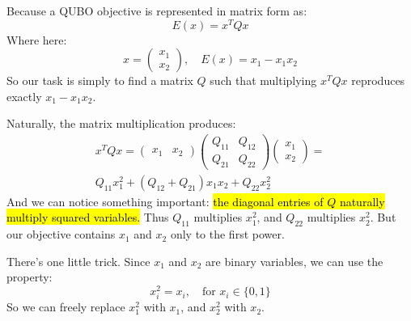 \begin{deepeningbox}
    Because a QUBO objective is represented in matrix form as:
    \begin{equation*}
        E(x) = x^T Q x
    \end{equation*}
    Where here:
    \begin{equation*}
        x =
        \begin{pmatrix}
            x_1 \\
            x_2
        \end{pmatrix},
        \quad
        E(x) = x_1 - x_1 x_2
    \end{equation*}
    So our task is simply to find a matrix $Q$ such that multiplying $x^T Q x$ reproduces exactly $x_1 - x_1 x_2$.

    \highspace
    Naturally, the matrix multiplication produces:
    \begin{gather*}
        x^T Q x =
        \begin{pmatrix}
            x_1 & x_2
        \end{pmatrix}
        \begin{pmatrix}
            Q_{11} & Q_{12} \\
            Q_{21} & Q_{22}
        \end{pmatrix}
        \begin{pmatrix}
            x_1 \\
            x_2
        \end{pmatrix}
        = \\
        Q_{11}x_1^2 + (Q_{12}+Q_{21})x_1x_2 + Q_{22}x_2^2
    \end{gather*}
    And we can notice something important: \hl{the diagonal entries of $Q$ naturally multiply squared variables.} Thus $Q_{11}$ multiplies $x_1^2$, and $Q_{22}$ multiplies $x_2^2$. But our objective contains $x_1$ and $x_2$ only to the first power.

    \highspace
    There's one little trick. Since $x_1$ and $x_2$ are binary variables, we can use the property:
    \begin{equation*}
        x_i^2 = x_i, \quad \text{for } x_i \in \{0,1\}
    \end{equation*}
    So we can freely replace $x_1^2$ with $x_1$, and $x_2^2$ with $x_2$.
\end{deepeningbox}

